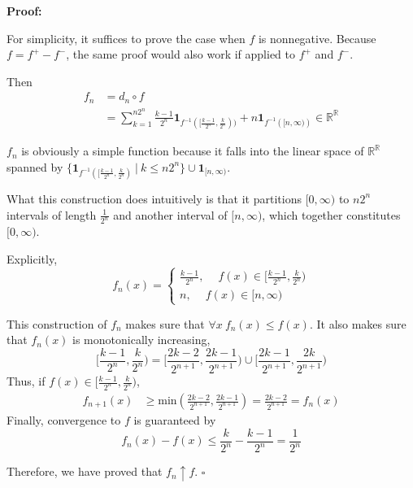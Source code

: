 \documentclass[UTF8, 12pt]{article}
\newenvironment{proof}{\noindent\ignorespaces\textbf{Proof:}}{\hfill $\square$\par\noindent}
\begin{document}
    \begin{proof}

        For simplicity, it suffices to prove the case when $f$ is nonnegative. Because $f = f^+ - f^-$, the same proof would also work if applied to $f^+$ and $f^-$.
        
        Then
        \begin{align*} 
            f_n &= d_n \circ f \\
            & = \sum_{k=1}^{n2^n} \frac{k-1}{2^n}\textbf{1}_{f^{-1}([\frac{k-1}{2^n}, \frac{k}{2^n}))} + n\textbf{1}_{f^{-1}({[n,\infty)})} \in \mathbb{R}^\mathbb{R}
        \end{align*}

        $f_n$ is obviously a simple function because it falls into the linear space of $\mathbb{R}^\mathbb{R}$ spanned by $\{\textbf{1}_{f^{-1}([\frac{k-1}{2^n}, \frac{k}{2^n})}\ |\ k \leq n2^n\}  \cup \textbf{1}_{[n,\infty)} $. 

        What this construction does intuitively is that it partitions $[0, \infty)$ to $n2^n$ intervals of length $\frac{1}{2^n}$ and another interval of $[n,\infty)$, which together constitutes $[0, \infty)$. 

        Explicitly, 
        \[
        f_n(x) =  
            \begin{cases}
                \frac{k-1}{2^n}, \quad \ f(x) \in [\frac{k-1}{2^n}, \frac{k}{2^n}) \\
                n, \quad \  f(x) \in [n, \infty)
            \end{cases}
        \]

        This construction of $f_n$ makes sure that $\forall x\ f_n(x) \leq f(x)$.
        It also makes sure that $f_n(x)$ is monotonically increasing, 
        $$
        [\frac{k-1}{2^n}, \frac{k}{2^n}) = [\frac{2k-2}{2^{n+1}}, \frac{2k-1}{2^{n+1}}) \cup [\frac{2k-1}{2^{n+1}}, \frac{2k}{2^{n+1}})
        $$
        Thus, if $f(x) \in [\frac{k-1}{2^n}, \frac{k}{2^n})$, 
        \begin{align*}
            f_{n+1}(x) &\geq \text{min}(\frac{2k-2}{2^{n+1}}, \frac{2k-1}{2^{n+1}}) = \frac{2k-2}{2^{n+1}} = f_n(x)
        \end{align*}
        Finally, convergence to $f$ is guaranteed by $$ f_n(x) - f(x) \leq \frac{k}{2^n} - \frac{k-1}{2^n} = \frac{1}{2^n} $$
    
        Therefore, we have proved that $f_n \uparrow f$. 
    \end{proof}
\end{document}

